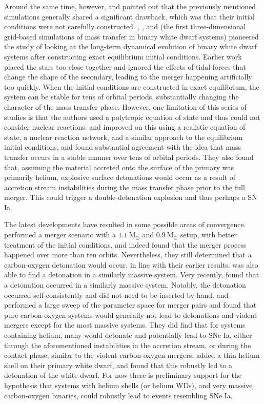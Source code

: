 \documentclass[iop]{emulateapj}
\newcommand{\msolar}{\mathrm{M}_\odot}
\begin{document}
Around the same time, however, \cite{guillochon:2010} and
\cite{dan:2011} pointed out that the previously mentioned simulations 
generally shared a significant drawback, which was that their initial conditions
were not carefully constructed. \cite{motl:2002}, \cite{dsouza:2006},
and \cite{motl:2007} (the first three-dimensional grid-based
simulations of mass transfer in binary white dwarf systems) pioneered
the study of looking at the long-term dynamical evolution of binary
white dwarf systems after constructing exact equilibrium initial
conditions. Earlier work placed the stars too close together 
and ignored the effects of tidal forces that change the shape of the 
secondary, leading to the merger
happening artificially too quickly. When the initial conditions are
constructed in exact equilibrium, the system can be stable for tens of
orbital periods, substantially changing the character of the mass
transfer phase. However, one limitation of this series of studies is
that the authors used a polytropic equation of state and thus could
not consider nuclear reactions. \cite{guillochon:2010} and
\cite{dan:2011} improved on this using a realistic equation of state,
a nuclear reaction network, and a similar approach to the equilibrium
initial conditions, and found substantial agreement with the idea that
mass transfer occurs in a stable manner over tens of orbital
periods. They also found that, assuming the material accreted onto the
surface of the primary was primarily helium, explosive surface
detonations would occur as a result of accretion stream instabilities
during the mass transfer phase prior to the full merger. This could
trigger a double-detonation explosion and thus perhaps a SN Ia.

The latest developments have resulted in some possible areas of convergence.
\cite{pakmor:2012} performed a merger scenario
with a $1.1\ \msolar$ and $0.9\ \msolar$ setup, with better treatment
of the initial conditions, and indeed found that the merger process
happened over more than ten orbits. Nevertheless, they still determined
that a carbon-oxygen detonation would occur, in line with their
earlier results. \cite{moll:2014} was also able to find a detonation
in a similarly massive system. Very recently, \cite{kashyap:2015} 
found that a detonation occurred in a similarly massive system. Notably,
the detonation occurred self-consistently and did not need to be inserted 
by hand. \cite{dan:2012} and \cite{dan:2014} performed a large sweep 
of the parameter space for merger pairs and
found that pure carbon-oxygen systems would generally not lead to
detonations and violent mergers except for the most massive
systems. They did find that for systems containing helium, many
would detonate and potentially lead to SNe Ia, either through the
aforementioned instabilities in the accretion stream, or during the
contact phase, similar to the violent carbon-oxygen
mergers. \cite{pakmor:2013} added a thin helium shell on their primary
white dwarf, and found that this robustly led to a detonation of the
white dwarf. For now there is preliminary support for the hypothesis
that systems with helium shells (or helium WDs), and very massive carbon-oxygen binaries,
could robustly lead to events resembling SNe Ia.
\end{document}
